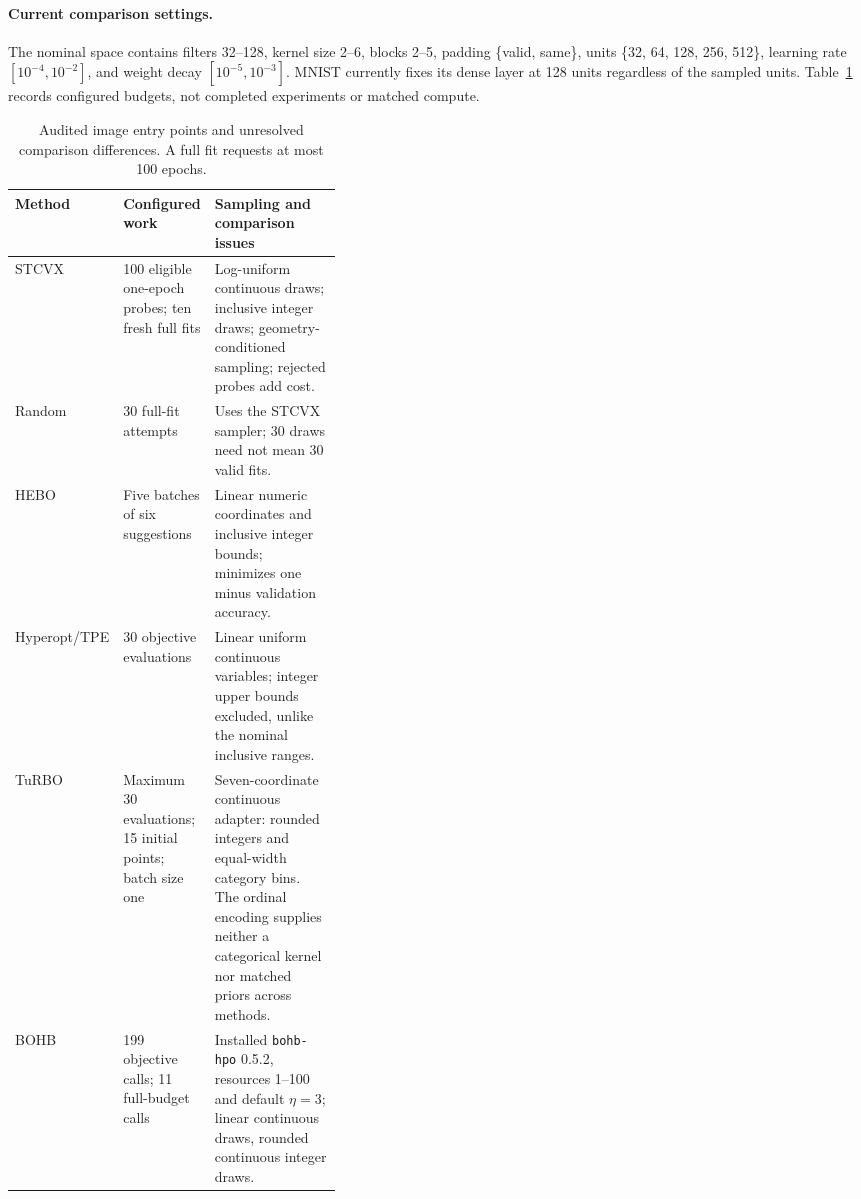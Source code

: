 \paragraph{Current comparison settings.}
The nominal space contains filters 32--128, kernel size 2--6, blocks 2--5, padding \{valid, same\}, units \{32, 64, 128, 256, 512\}, learning rate $[10^{-4},10^{-2}]$, and weight decay $[10^{-5},10^{-3}]$. MNIST currently fixes its dense layer at 128 units regardless of the sampled units. Table~\ref{tab:operational-settings} records configured budgets, not completed experiments or matched compute.

\begin{table}[htbp]
    \centering
    \small
    \caption{Audited image entry points and unresolved comparison differences. A full fit requests at most 100 epochs.}%
    \label{tab:operational-settings}
    \begin{tabularx}{\linewidth}{@{}p{0.13\linewidth}p{0.25\linewidth}X@{}}
        \toprule
        Method & Configured work & Sampling and comparison issues \\
        \midrule
        STCVX & 100 eligible one-epoch probes; ten fresh full fits & Log-uniform continuous draws; inclusive integer draws; geometry-conditioned sampling; rejected probes add cost. \\
        Random & 30 full-fit attempts & Uses the STCVX sampler; 30 draws need not mean 30 valid fits. \\
        HEBO & Five batches of six suggestions & Linear numeric coordinates and inclusive integer bounds; minimizes one minus validation accuracy. \\
        Hyperopt/TPE & 30 objective evaluations & Linear uniform continuous variables; integer upper bounds excluded, unlike the nominal inclusive ranges. \\
        TuRBO & Maximum 30 evaluations; 15 initial points; batch size one & Seven-coordinate continuous adapter: rounded integers and equal-width category bins. The ordinal encoding supplies neither a categorical kernel nor matched priors across methods. \\
        BOHB & 199 objective calls; 11 full-budget calls & Installed \texttt{bohb-hpo} 0.5.2, resources 1--100 and default $\eta=3$; linear continuous draws, rounded continuous integer draws. \\
        \bottomrule
    \end{tabularx}
\end{table}

